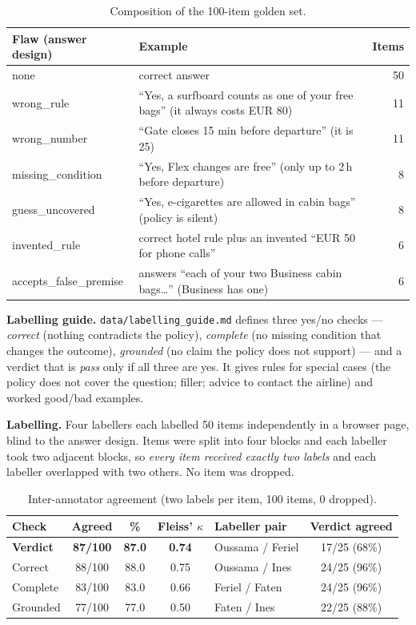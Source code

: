 \documentclass[10pt,a4paper]{article}
\newcommand{\code}[1]{\texttt{#1}}
\begin{document}
\begin{table}[htbp]
\centering\small
\begin{tabularx}{\linewidth}{@{}lXr@{}}
\toprule
Flaw (answer design) & Example & Items \\
\midrule
none & correct answer & 50 \\
wrong\_rule & ``Yes, a surfboard counts as one of your free bags'' (it always costs EUR 80) & 11 \\
wrong\_number & ``Gate closes 15 min before departure'' (it is 25) & 11 \\
missing\_condition & ``Yes, Flex changes are free'' (only up to 2\,h before departure) & 8 \\
guess\_uncovered & ``Yes, e-cigarettes are allowed in cabin bags'' (policy is silent) & 8 \\
invented\_rule & correct hotel rule plus an invented ``EUR 50 for phone calls'' & 6 \\
accepts\_false\_premise & answers ``each of your two Business cabin bags\dots'' (Business has one) & 6 \\
\bottomrule
\end{tabularx}
\caption{Composition of the 100-item golden set.}
\label{tab:composition}
\end{table}

\textbf{Labelling guide.} \code{data/labelling\_guide.md} defines three yes/no checks --- \emph{correct} (nothing contradicts the policy), \emph{complete} (no missing condition that changes the outcome), \emph{grounded} (no claim the policy does not support) --- and a verdict that is \emph{pass} only if all three are yes. It gives rules for special cases (the policy does not cover the question; filler; advice to contact the airline) and worked good/bad examples.

\textbf{Labelling.} Four labellers each labelled 50 items independently in a browser page, blind to the answer design. Items were split into four blocks and each labeller took two adjacent blocks, so \emph{every item received exactly two labels} and each labeller overlapped with two others. No item was dropped.

\begin{table}[htbp]
\centering\small
\begin{tabular}{@{}lccc@{\hspace{1.5em}}lc@{}}
\toprule
Check & Agreed & \% & Fleiss' $\kappa$ & Labeller pair & Verdict agreed \\
\midrule
\textbf{Verdict} & \textbf{87/100} & \textbf{87.0} & \textbf{0.74} & Oussama / Feriel & 17/25 (68\%) \\
Correct & 88/100 & 88.0 & 0.75 & Oussama / Ines & 24/25 (96\%) \\
Complete & 83/100 & 83.0 & 0.66 & Feriel / Faten & 24/25 (96\%) \\
Grounded & 77/100 & 77.0 & 0.50 & Faten / Ines & 22/25 (88\%) \\
\bottomrule
\end{tabular}
\caption{Inter-annotator agreement (two labels per item, 100 items, 0 dropped).}
\label{tab:iaa}
\end{table}
\end{document}

